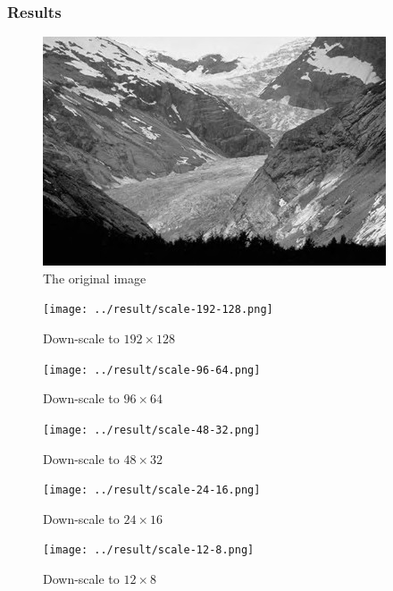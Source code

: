 \documentclass{article}
\begin{document}
\subsubsection{Results}
\label{sec:scaleresult}
\begin{figure}[H]
\centering
\includegraphics[width=288pt]{../img/02.png}
\caption{The original image}
\label{scaleorigin}
\end{figure}


\iffalse

\begin{figure}[H]
\centering
\texttt{[image: ../result/scale-192-128.png]}
\caption{Down-scale to $192 \times 128$}
\label{scale192}
\end{figure}

\begin{figure}[H]
\centering
\texttt{[image: ../result/scale-96-64.png]}
\caption{Down-scale to $96 \times 64$}
\label{scale96}
\end{figure}

\begin{figure}[H]
\centering
\texttt{[image: ../result/scale-48-32.png]}
\caption{Down-scale to $48 \times 32$}
\label{scale48}
\end{figure}

\begin{figure}[H]
\centering
\texttt{[image: ../result/scale-24-16.png]}
\caption{Down-scale to $24 \times 16$}
\label{scale24}
\end{figure}

\begin{figure}[H]
\centering
\texttt{[image: ../result/scale-12-8.png]}
\caption{Down-scale to $12 \times 8$}
\label{scale12}
\end{figure}
\end{document}

